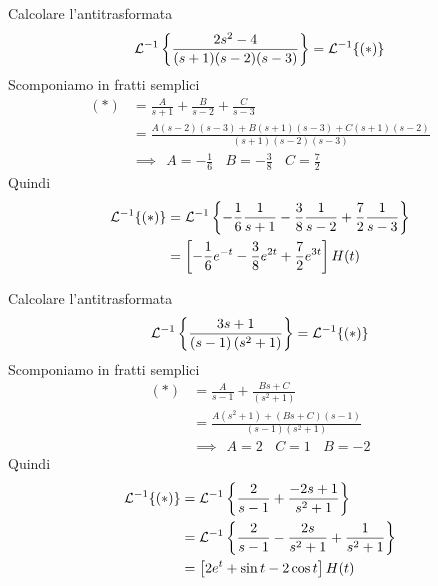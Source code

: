 Calcolare l'antitrasformata
\begin{equation*}
\mathcal{L}^{-1}\left\{\frac{2s^{2} -4}{( s+1)( s-2)( s-3)}\right\} =\mathcal{L}^{-1}\{( *)\}
\end{equation*}
Scomponiamo in fratti semplici
\begin{equation*}
\begin{aligned}
( *) & =\frac{A}{s+1} +\frac{B}{s-2} +\frac{C}{s-3}\\
 & =\frac{A( s-2)( s-3) +B( s+1)( s-3) +C( s+1)( s-2)}{( s+1)( s-2)( s-3)}\\
 & \implies \ \ A=-\frac{1}{6} \ \ \ \ B=-\frac{3}{8} \ \ \ \ C=\frac{7}{2}
\end{aligned}
\end{equation*}
Quindi
\begin{equation*}
\begin{aligned}
\mathcal{L}^{-1}\{( *)\} & =\mathcal{L}^{-1}\left\{-\frac{1}{6}\frac{1}{s+1} -\frac{3}{8}\frac{1}{s-2} +\frac{7}{2}\frac{1}{s-3}\right\}\\
 & =\left[ -\frac{1}{6} e^{-t} -\frac{3}{8} e^{2t} +\frac{7}{2} e^{3t}\right] H( t)
\end{aligned}
\end{equation*}
\Esercizio{}

Calcolare l'antitrasformata
\begin{equation*}
\mathcal{L}^{-1}\left\{\frac{3s+1}{( s-1)\left( s^{2} +1\right)}\right\} =\mathcal{L}^{-1}\{( *)\}
\end{equation*}
Scomponiamo in fratti semplici
\begin{equation*}
\begin{aligned}
( *) & =\frac{A}{s-1} +\frac{Bs+C}{\left( s^{2} +1\right)}\\
 & =\frac{A\left( s^{2} +1\right) +( Bs+C)( s-1)}{( s-1)\left( s^{2} +1\right)}\\
 & \implies \ \ A=2\ \ \ \ C=1\ \ \ \ B=-2
\end{aligned}
\end{equation*}
Quindi
\begin{equation*}
\begin{aligned}
\mathcal{L}^{-1}\{( *)\} & =\mathcal{L}^{-1}\left\{\frac{2}{s-1} +\frac{-2s+1}{s^{2} +1}\right\}\\
 & =\mathcal{L}^{-1}\left\{\frac{2}{s-1} -\frac{2s}{s^{2} +1} +\frac{1}{s^{2} +1}\right\}\\
 & =\left[ 2e^{t} +\sin t-2\cos t\right] H( t)
\end{aligned}
\end{equation*}
\Esercizio{}

